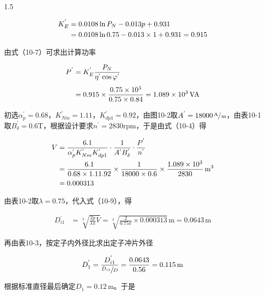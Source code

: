 \documentclass[a4paper,11pt]{ctexart}
\newcommand{\A}{\,\text{A}}
\newcommand{\VA}{\,\text{VA}}
\newcommand{\m}{\,\text{m}}
\newcommand{\rpm}{\text{rpm}}
\newcommand{\T}{\text{T}}
\newenvironment{shrinkeq}[2]
{
	\bgroup
	\addtolength\abovedisplayshortskip{#1}
	\addtolength\abovedisplayskip{#1}
	\addtolength\belowdisplayshortskip{#2}
	\addtolength\belowdisplayskip{#2}
}
{
	\egroup
	\ignorespacesafterend
}
\begin{document}
\begin{spacing}{1.5}
\begin{shrinkeq}{-1.5ex}{-1.5ex}
	\begin{align}
	K_{E}^{'} &= 0.0108\ln P_N - 0.013p +0.931 \\
	&= 0.0108\ln 0.75 - 0.013\times 1 +0.931 = 0.915 \notag
	\end{align}
\end{shrinkeq}
\par
由式（10-7）可求出计算功率
\begin{shrinkeq}{-1.5ex}{-1ex}
	\begin{align}
	P^{'} &= K_{E}^{'}\frac{P_N}{\eta^{'}\cos\varphi^{'}} \\[1.5mm]
	&= 0.915\times\frac{0.75\times 10^3}{0.75\times 0.84} = 1.089\times 10^3 \VA\notag
	\end{align}
\end{shrinkeq}
\par
初选$\alpha_{p}^{'} = 0.68$，$K_{Nm}^{'} = 1.11$，$K_{dp1}^{'} = 0.92$，由图10-2取$A^{'} =18000\sfrac{\A}{\m}$，由表10-1取$B_{\delta}^{'} = 0.6\T$，根据设计要求$n^{'}=2830\rpm$，于是由式（10-4）得
\begin{shrinkeq}{-1.5ex}{-1.5ex}
	\begin{align}
	V &= \frac{6.1}{\alpha_{p}^{'}K_{Nm}^{'}K_{dp1}^{'}}\cdot\frac{1}{A^{'}B_{\delta}^{'}}\cdot\frac{P^{'}}{n^{'}} \\
	&=\frac{6.1}{0.68\times 1.11\time 0.92}\times\frac{1}{18000\times 0.6}\times\frac{1.089\times 10^3}{2830}\m^3 \notag\\
	&=0.000313 \notag
	\end{align}
\end{shrinkeq}
\par
由表10-2取$\lambda = 0.75$，代入式（10-9），得
\begin{shrinkeq}{-1ex}{-1ex}
	\begin{align}
	D_{i1}^{'} &= \sqrt[3]{\frac{2p}{\lambda\pi}V}=\sqrt[3]{\frac{2}{0.75\pi}\times 0.000313}\m = 0.0643\m 
	\end{align}
\end{shrinkeq}
再由表10-3，按定子内外径比求出定子冲片外径
\begin{shrinkeq}{-1.5ex}{-1.5ex}
	\begin{align}
	D_{1}^{'} = \frac{D_{i1}^{'}}{\sfrac{D_{i1}}{D}} = \frac{0.0643}{0.56}  = 0.115\m
	\end{align}
\end{shrinkeq}
\par
根据标准直径最后确定$D_1 = 0.12\m$。于是
\begin{shrinkeq}{-1.5ex}{-1.5ex}
	\begin{align}

\end{align}
\end{shrinkeq}
\end{spacing}
\end{document}
